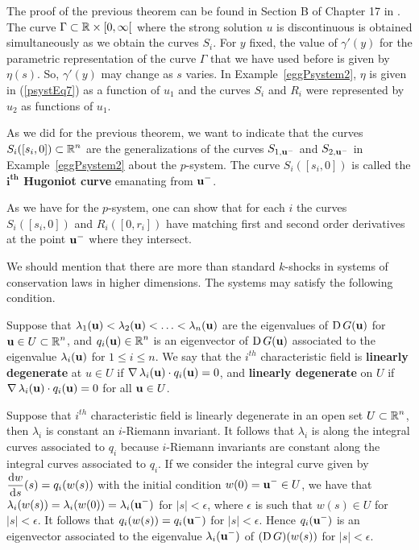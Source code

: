 The proof of the previous theorem can be found in Section B of
Chapter 17 in \cite{Smo}.  The curve $\Gamma \subset \mathbb{R}\times [0,\infty[$
where the strong solution $u$ is discontinuous is obtained
simultaneously as we obtain the curves $S_i$.  For $y$ fixed, the value of
$\gamma'(y)$ for the parametric representation of the curve $\Gamma$
that we have used before is given by $\eta(s)$.  So, $\gamma'(y)$
may change as $s$ varies.
In Example~\ref{eggPsystem2}, $\eta$ is given in
(\ref{psystEq7}) as a function of $u_1$ and the curves $S_i$ and $R_i$
were represented by $u_2$ as functions of $u_1$.

As we did for the previous theorem, we want to indicate that the
curves $\displaystyle S_i([s_i,0]) \subset \mathbb{R}^n$ are the generalizations of the
curves $S_{1,\mathbf{u}^-}$ and $S_{2,\mathbf{u}^-}$ in
Example~\ref{eggPsystem2} about the $p$-system.
The curve $S_i([s_i,0])$ is called the
{\bfseries $\displaystyle \mathbf{i^{th}}$ Hugoniot curve} emanating from
$\displaystyle \mathbf{u}^-$.

As we have for the $p$-system, one can show that for each $i$ the
curves $S_i([s_i,0])$ and $R_i([0,r_i])$ have matching first and second
order derivatives at the point $\displaystyle \mathbf{u}^-$ where they intersect.

We should mention that there are more than standard $k$-shocks in
systems of conservation laws in higher dimensions.   The systems may
satisfy the following condition.

\begin{defn}
Suppose that
$\lambda_1(\mathbf{u}) < \lambda_2(\mathbf{u}) < \ldots < \lambda_n(\mathbf{u})$
are the eigenvalues of $\operatorname{D} G(\mathbf{u})$ for
$\displaystyle \mathbf{u} \in U \subset \mathbb{R}^n$,
and $\displaystyle q_i(\mathbf{u}) \in \mathbb{R}^n$ is an eigenvector of
$\operatorname{D} G(\mathbf{u})$
associated to the eigenvalue $\lambda_i(\mathbf{u})$ for $1 \leq i \leq n$.
We say that the $\displaystyle i^{th}$ characteristic field is
{\bfseries linearly degenerate} at
$u \in U$ if $\operatorname{\nabla} \lambda_i(\mathbf{u}) \cdot q_i(\mathbf{u}) = 0$,
and {\bfseries linearly degenerate} on $U$ if
$\operatorname{\nabla} \lambda_i(\mathbf{u}) \cdot q_i(\mathbf{u}) = 0$ for all $\mathbf{u} \in U$.
\end{defn}

Suppose that $\displaystyle i^{th}$ characteristic field is linearly
degenerate in an open set $\displaystyle U \subset \mathbb{R}^n$, then
$\lambda_i$ is constant an $i$-Riemann invariant.  It follows that
$\lambda_i$ is along the integral curves associated to $q_i$ because
$i$-Riemann invariants are constant along the integral curves
associated to $q_i$.  If we consider the integral curve given by
$\displaystyle \frac{\mathrm{d}w}{\mathrm{d}{s}}(s) = q_i(w(s))$ with the
initial condition $\displaystyle w(0) = \mathbf{u}^- \in U$, we have that
$\displaystyle \lambda_i(w(s)) = \lambda_i(w(0)) = \lambda_i(\mathbf{u}^-)$
for $|s| < \epsilon$, where $\epsilon$ is such that $w(s) \in U$ for
$|s| < \epsilon$.
It follows that $\displaystyle q_i(w(s)) = q_i(\mathbf{u}^-)$ for
$|s| < \epsilon$.  Hence $\displaystyle q_i(\mathbf{u}^-)$ is an eigenvector
associated to the eigenvalue $\displaystyle \lambda_i(\mathbf{u}^-)$ of
$(\operatorname{D} G)(w(s))$ for $|s| < \epsilon$.

